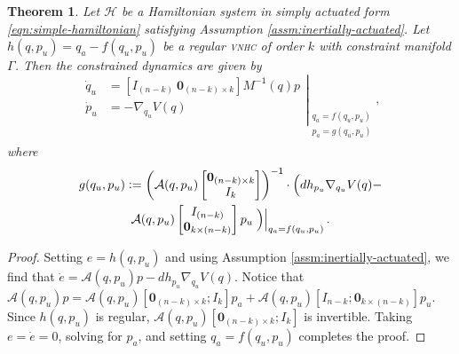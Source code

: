 \documentclass[journal,twoside,web, twocolumn]{ieeecolor}
\newtheorem{thm}{Theorem}%
\newcommand*{\inv}{^\mathsf{-1}}
\newcommand*{\Minv}{M^\mathsf{-1}}
\newcommand*{\Id}[1]{I_{#1}}
\newcommand*{\Zmat}[1]{\bm{0}_{#1}}
\newcommand*{\eqdef}{\vcentcolon=}
\newcommand*{\vnhc}{\textsc{vnhc}\xspace}
\begin{document}
\begin{thm}\label{thm:zero-dynamics}
    Let \(\mathcal{H}\) be a Hamiltonian system in simply actuated form
    \eqref{eqn:simple-hamiltonian} satisfying
    Assumption \ref{assm:inertially-actuated}. 
    Let \(h(q,p_u) = q_a - f(q_u,p_u)\) be a regular \vnhc of order \(k\) with
    constraint manifold \(\Gamma\). 
    Then the constrained dynamics are given by
    \begin{equation}\label{eqn:qpu-dynamics}
        \left.\begin{aligned}
                \dot{q}_u &= 
                \left[\Id{(n-k)} ~ \Zmat{(n-k) \times k}\right]
                \Minv(q)p \\
            \dot{p}_u &= -\nabla_{q_u}V(q) \\
            \end{aligned}{}\right|_{\begin{array}{c}
                q_a = f(q_u,p_u) \\ 
                p_a = g(q_u,p_u) \\
            \end{array}}
            ,
    \end{equation}
    where
    \begin{multline}\label{eqn:g-qpu}
        g(q_u,p_u) \eqdef \left( \mathcal{A}(q,p_u)
        \begin{bmatrix} \Zmat{(n-k)\times k} \\ \Id{k} \end{bmatrix}\right)\inv 
        \cdot
        \Big(dh_{p_u}\nabla_{q_u}V(q) -
        \\
        \mathcal{A}(q,p_u)
        \begin{bmatrix} \Id{(n-k)} \\ \Zmat{k \times (n-k)} \end{bmatrix} p_u
        \left.\Big)\right|_{q_a = f(q_u,p_u)}
        .
    \end{multline}

\end{thm}
\begin{proof}
    Setting \(e = h(q,p_u)\) and using Assumption
    \ref{assm:inertially-actuated}, we find that
    \(\dot{e} = \mathcal{A}(q,p_u)p - dh_{p_u}\nabla_{q_u}V(q)\).
    Notice that
    \(\mathcal{A}(q,p_u)p = \mathcal{A}(q,p_u)[\Zmat{(n-k)\times k}; \Id{k}]p_a
    + \mathcal{A}(q,p_u)[\Id{n-k};\Zmat{k \times (n-k)}] p_u\).
    Since \(h(q,p_u)\) is regular,
    \(\mathcal{A}(q,p_u)[\Zmat{(n-k)\times k}; \Id{k}]\) is invertible.
    Taking \(e = \dot{e} = 0\), solving for \(p_a\), and setting 
    \(q_a = f(q_u,p_u)\) completes the proof.
\end{proof}
\end{document}
